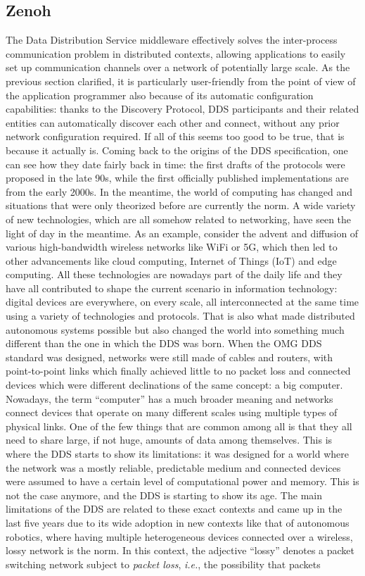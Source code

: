 \subsection{Zenoh}
\label{sec:zenoh}
The Data Distribution Service middleware effectively solves the inter-process communication problem in distributed contexts, allowing applications to easily set up communication channels over a network of potentially large scale. As the previous section clarified, it is particularly user-friendly from the point of view of the application programmer also because of its automatic configuration capabilities: thanks to the Discovery Protocol, DDS participants and their related entities can automatically discover each other and connect, without any prior network configuration required. If all of this seems too good to be true, that is because it actually is. Coming back to the origins of the DDS specification, one can see how they date fairly back in time: the first drafts of the protocols were proposed in the late 90s, while the first officially published implementations are from the early 2000s. In the meantime, the world of computing has changed and situations that were only theorized before are currently the norm. A wide variety of new technologies, which are all somehow related to networking, have seen the light of day in the meantime. As an example, consider the advent and diffusion of various high-bandwidth wireless networks like WiFi or 5G, which then led to other advancements like cloud computing, Internet of Things (IoT) and edge computing. All these technologies are nowadays part of the daily life and they have all contributed to shape the current scenario in information technology: digital devices are everywhere, on every scale, all interconnected at the same time using a variety of technologies and protocols. That is also what made distributed autonomous systems possible but also changed the world into something much different than the one in which the DDS was born. When the OMG DDS standard was designed, networks were still made of cables and routers, with point-to-point links which finally achieved little to no packet loss and connected devices which were different declinations of the same concept: a big computer. Nowadays, the term ``computer'' has a much broader meaning and networks connect devices that operate on many different scales using multiple types of physical links. One of the few things that are common among all is that they all need to share large, if not huge, amounts of data among themselves. This is where the DDS starts to show its limitations: it was designed for a world where the network was a mostly reliable, predictable medium and connected devices were assumed to have a certain level of computational power and memory. This is not the case anymore, and the DDS is starting to show its age. The main limitations of the DDS are related to these exact contexts and came up in the last five years due to its wide adoption in new contexts like that of autonomous robotics, where having multiple heterogeneous devices connected over a wireless, lossy network is the norm. In this context, the adjective ``lossy'' denotes a packet switching network subject to \emph{packet loss}, \emph{i.e.}, the possibility that packets 
